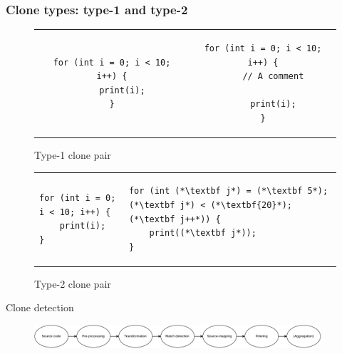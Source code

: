 \documentclass[aspectratio=1610, xcolor=table]{beamer}
\begin{document}
\begin{frame}[fragile]
	\frametitle{Clone types: type-1 and type-2}
    \begin{figure}[t]
		\begin{center}
			\begin{tabular}{c | c}
				\begin{lstlisting}
for (int i = 0; i < 10;   i++) {
    print(i);
}
\end{lstlisting} &
				\begin{lstlisting}
for (int i = 0; i < 10; i++) {
    // A comment

    print(i);
}
            \end{lstlisting}
			\end{tabular}
		\end{center}
        \caption{Type-1 clone pair}
    \end{figure}
    \begin{figure}[t]
        	\begin{center}
        \begin{tabular}{p{6cm} | p{6cm}}
\begin{lstlisting}
for (int i = 0; i < 10; i++) {
    print(i);
}
\end{lstlisting} & \begin{lstlisting}
for (int (*\textbf j*) = (*\textbf 5*); (*\textbf j*) < (*\textbf{20}*); (*\textbf j++*)) {
    print((*\textbf j*));
}
\end{lstlisting}
		\end{tabular}
	\end{center}

        \caption{Type-2 clone pair}
    \end{figure}

\end{frame}



\begin{frame}{Clone detection}
    \begin{figure}
        \begin{center}
            \includegraphics[width=0.95\textwidth]{figures/detectionphases.drawio.pdf}
        \end{center}
    \end{figure}
\end{frame}
\end{document}
